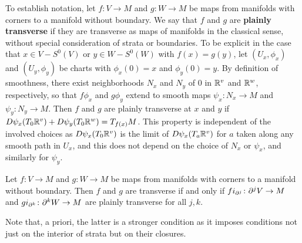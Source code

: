 To establish notation, let $f \colon V \to M$ and $g \colon W \to M$ be maps from manifolds with corners to a manifold without boundary.
We say that $f$ and $g$ are \textbf{plainly transverse} if they are transverse as maps of manifolds in the classical sense, without special consideration of strata or boundaries.
To be explicit in the case that $x \in V-S^0(V)$ or $y \in W-S^0(W)$ with $f(x) = g(y)$, let $(U_x,\phi_x)$ and $(U_y,\phi_y)$ be charts with $\phi_x(0) = x$ and $\phi_y(0) = y$.
By definition of smoothness, there exist neighborhoods $N_x$ and $N_y$ of $0$ in $\mathbb{R}^v$ and $\mathbb{R}^w$, respectively, so that $f\phi_x$ and $g\phi_y$ extend to smooth maps $\psi_x \colon N_x \to M$ and $\psi_y \colon N_y \to M$.
Then $f$ and $g$ are plainly transverse at $x$ and $y$ if $D\psi_x(T_0 \mathbb{R}^v)+D\psi_y(T_0\mathbb{R}^w) = T_{f(x)}M$.
This property is independent of the involved choices as $D\psi_x(T_0 \mathbb{R}^v)$ is the limit of $D\psi_x(T_{a} \mathbb{R}^v)$ for $a$ taken along any smooth path in $U_x$, and this does not depend on the choice of $N_x$ or $\psi_x$, and similarly for $\psi_y$.

\begin{lemma}\label{L: simple trans}
	Let $f \colon V \to M$ and $g \colon W \to M$ be maps from manifolds with corners to a manifold without boundary.
	Then $f$ and $g$ are transverse if and only if $fi_{\partial^j} \colon \partial^jV \to M$ and $gi_{\partial^k} \colon \partial^kW \to M$ are plainly transverse for all $j,k$.
\end{lemma}

Note that, a priori, the latter is a stronger condition as it imposes conditions not just on the interior of strata but on their closures.

